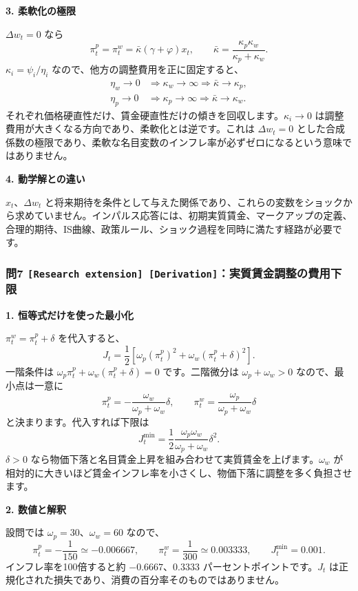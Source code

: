 \documentclass[
  japanese,
  lualatex,
  ja=standard,
  11pt,
  a4paper]{ltjsarticle}
\begin{document}
\textbf{3. 柔軟化の極限}

\(\Delta w_t=0\) なら \[
\pi_t^p=\pi_t^w=\bar\kappa(\gamma+\varphi)x_t,
\qquad
\bar\kappa=\frac{\kappa_p\kappa_w}{\kappa_p+\kappa_w}.
\] \(\kappa_i=\psi_i/\eta_i\) なので、他方の調整費用を正に固定すると、
\[
\begin{aligned}
\eta_w\to0&\Rightarrow\kappa_w\to\infty
\Rightarrow\bar\kappa\to\kappa_p,\\
\eta_p\to0&\Rightarrow\kappa_p\to\infty
\Rightarrow\bar\kappa\to\kappa_w.
\end{aligned}
\]
それぞれ価格硬直性だけ、賃金硬直性だけの傾きを回収します。\(\kappa_i\to0\)
は調整費用が大きくなる方向であり、柔軟化とは逆です。これは
\(\Delta w_t=0\)
とした合成係数の極限であり、柔軟な名目変数のインフレ率が必ずゼロになるという意味ではありません。


\textbf{4. 動学解との違い}

\(x_t\)、\(\Delta w_t\)
と将来期待を条件として与えた関係であり、これらの変数をショックから求めていません。インパルス応答には、初期実質賃金、マークアップの定義、合理的期待、IS曲線、政策ルール、ショック過程を同時に満たす経路が必要です。

\subsubsection{\texorpdfstring{問7
\texttt{{[}Research\ extension{]}\ {[}Derivation{]}}：実質賃金調整の費用下限}{問7 {[}Research extension{]} {[}Derivation{]}：実質賃金調整の費用下限}}\label{ux554f7-research-extension-derivationux5b9fux8ceaux8cc3ux91d1ux8abfux6574ux306eux8cbbux7528ux4e0bux9650}

\textbf{1. 恒等式だけを使った最小化}

\(\pi_t^w=\pi_t^p+\delta\) を代入すると、 \[
J_t=\frac12\left[\omega_p(\pi_t^p)^2
+\omega_w(\pi_t^p+\delta)^2\right].
\] 一階条件は \(\omega_p\pi_t^p+\omega_w(\pi_t^p+\delta)=0\)
です。二階微分は \(\omega_p+\omega_w>0\) なので、最小点は一意に \[
\pi_t^p=-\frac{\omega_w}{\omega_p+\omega_w}\delta,
\qquad
\pi_t^w=\frac{\omega_p}{\omega_p+\omega_w}\delta
\] と決まります。代入すれば下限は \[
J_t^{\min}=\frac12\frac{\omega_p\omega_w}{\omega_p+\omega_w}\delta^2.
\] \(\delta>0\)
なら物価下落と名目賃金上昇を組み合わせて実質賃金を上げます。\(\omega_w\)
が相対的に大きいほど賃金インフレ率を小さくし、物価下落に調整を多く負担させます。

\textbf{2. 数値と解釈}

設問では \(\omega_p=30\)、\(\omega_w=60\) なので、 \[
\pi_t^p=-\frac1{150}\simeq-0.006667,
\qquad
\pi_t^w=\frac1{300}\simeq0.003333,
\qquad
J_t^{\min}=0.001.
\] インフレ率を100倍すると約 \(-0.6667\)、\(0.3333\)
パーセントポイントです。\(J_t\)
は正規化された損失であり、消費の百分率そのものではありません。
\end{document}
